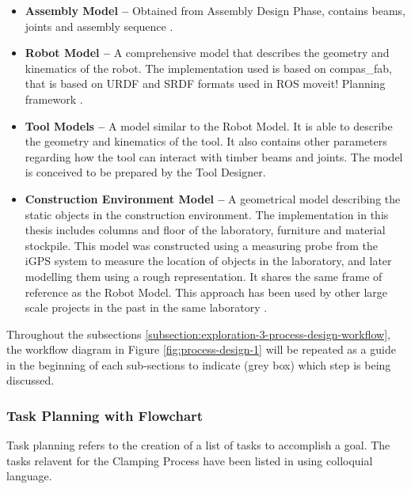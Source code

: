 \begin{itemize}
	\item \textbf{Assembly Model --} Obtained from Assembly Design Phase, contains beams, joints and assembly sequence .

	\item \textbf{Robot Model --} A comprehensive model that describes the geometry and kinematics of the robot. The implementation used is based on compas\_fab, that is based on URDF and SRDF formats used in ROS moveit! Planning framework \parencite{SrdfROSWiki2023, UrdfROSWiki2023}.

	\item \textbf{Tool Models --} A model similar to the Robot Model. It is able to describe the geometry and kinematics of the tool. It also contains other parameters regarding how the tool can interact with timber beams and joints. The model is conceived to be prepared by the Tool Designer.

	\item \textbf{Construction Environment Model --} A geometrical model describing the static objects in the construction environment. The implementation in this thesis includes columns and floor of the laboratory, furniture and material stockpile. This model was constructed using a measuring probe from the iGPS system to measure the location of objects in the laboratory, and later modelling them using a rough representation. It shares the same frame of reference as the Robot Model. This approach has been used by other large scale projects in the past in the same laboratory \parencite{thomaRoboticFabricationBespoke2018}.

\end{itemize}

Throughout the subsections \ref{subsection:exploration-3-process-design-workflow}, the workflow diagram in Figure \ref{fig:process-design-1} will be repeated as a guide in the beginning of each sub-sections to indicate (grey box) which step is being discussed.

\FloatBarrier

\subsubsection{Task Planning with Flowchart}
\label{subsubsection:exploration-3-task-planning-with-flowchart}

Task planning refers to the creation of a list of tasks to accomplish a goal. The tasks relavent for the Clamping Process have been listed in  using colloquial language.

